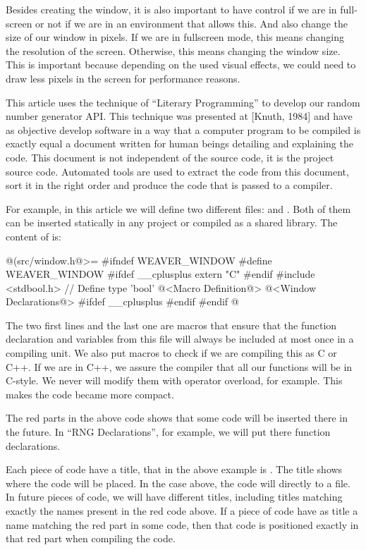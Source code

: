 Besides creating the window, it is also important to have control if
we are in full-screen or not if we are in an environment that allows
this. And also change the size of our window in pixels. If we are in
fullscreen mode, this means changing the resolution of the
screen. Otherwise, this means changing the window size. This is
important because depending on the used visual effects, we could need
to draw less pixels in the screen for performance reasons.


This article uses the technique of ``Literary Programming'' to develop
our random number generator API. This technique was presented at
[Knuth, 1984] and have as objective develop software in a way that a
computer program to be compiled is exactly equal a document written
for human beings detailing and explaining the code. This document is
not independent of the source code, it is the project source
code. Automated tools are used to extract the code from this document,
sort it in the right order and produce the code that is passed to a
compiler.

For example, in this article we will define two different
files:  and . Both of them
can be inserted statically in any project or compiled as a shared
library. The content of  is:

\iniciocodigo
@(src/window.h@>=
#ifndef WEAVER_WINDOW
#define WEAVER_WINDOW
#ifdef __cplusplus
extern "C" {
#endif
#include <stdbool.h> // Define type 'bool'
@<Macro Definition@>
@<Window Declarations@>
#ifdef __cplusplus
}
#endif
#endif
@
\fimcodigo

The two first lines and the last one are macros that ensure that the
function declaration and variables from this file will always be
included at most once in a compiling unit. We also put macros to check
if we are compiling this as C or C++. If we are in C++, we assure the
compiler that all our functions will be in C-style. We never will
modify them with operator overload, for example. This makes the code
became more compact.

The red parts in the above code shows that some code will be inserted
there in the future. In ``RNG Declarations'', for example, we will put
there function declarations.

Each piece of code have a title, that in the above example is
. The title shows where the code will be placed.
In the case above, the code will directly to a file. In future pieces
of code, we will have different titles, including titles matching
exactly the names present in the red code above. If a piece of code
have as title a name matching the red part in some code, then that
code is positioned exactly in that red part when compiling the code.

